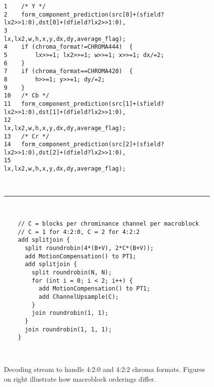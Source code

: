 \begin{figure*}[t]
 \begin{minipage}[t]{4.3in}
   {
    \begin{scriptsize}
    \begin{verbatim}
1    /* Y */
2    form_component_prediction(src[0]+(sfield?lx2>>1:0),dst[0]+(dfield?lx2>>1:0),
3                              lx,lx2,w,h,x,y,dx,dy,average_flag);
4    if (chroma_format!=CHROMA444)  {
5        lx>>=1; lx2>>=1; w>>=1; x>>=1; dx/=2;
6    }
7    if (chroma_format==CHROMA420)  {
8        h>>=1; y>>=1; dy/=2;
9    }
10   /* Cb */
11   form_component_prediction(src[1]+(sfield?lx2>>1:0),dst[1]+(dfield?lx2>>1:0),
12                             lx,lx2,w,h,x,y,dx,dy,average_flag);
13   /* Cr */
14   form_component_prediction(src[2]+(sfield?lx2>>1:0),dst[2]+(dfield?lx2>>1:0),
15                             lx,lx2,w,h,x,y,dx,dy,average_flag);    
    \end{verbatim}
    \end{scriptsize}
   }
  \end{minipage}
    ~~\hrule~~
 \begin{minipage}[t]{4.3in}
   {
    \begin{scriptsize}
    \begin{verbatim}
    // C = blocks per chrominance channel per macroblock 
    // C = 1 for 4:2:0, C = 2 for 4:2:2
    add splitjoin {
      split roundrobin(4*(B+V), 2*C*(B+V));
      add MotionCompensation() to PT1;
      add splitjoin {
        split roundrobin(N, N);
        for (int i = 0; i < 2; i++) {
          add MotionCompensation() to PT1;
          add ChannelUpsample(C);
        }
        join roundrobin(1, 1);
      }
      join roundrobin(1, 1, 1);
    }
    \end{verbatim}
    \end{scriptsize}
   }
  \end{minipage}
  ~~\vrule~~
  \begin{minipage}[t]{2.0in}
  {
   \begin{center}
   \end{center}
  }
  \end{minipage}
  \caption{Decoding stream to handle 4:2:0 and 4:2:2 chroma
    formats. Figures on right illustrate how macroblock orderings
    differ.}
  \label{fig:chroma}
\end{figure*}